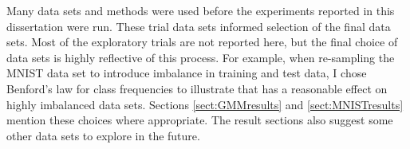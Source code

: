 Many data sets and methods were used before the experiments reported in this dissertation were run.  These trial data sets informed selection of the final data sets.  Most of the exploratory trials are not reported here, but the final choice of data sets is highly reflective of this process.  For example, when re-sampling the MNIST data set to introduce imbalance in training and test data, I chose Benford's law for class frequencies to illustrate that \RS has a reasonable effect on highly imbalanced data sets.  Sections \ref{sect:GMMresults} and \ref{sect:MNISTresults} mention these choices where appropriate. The result sections also suggest some other data sets to explore in the future.

\FloatBarrier
